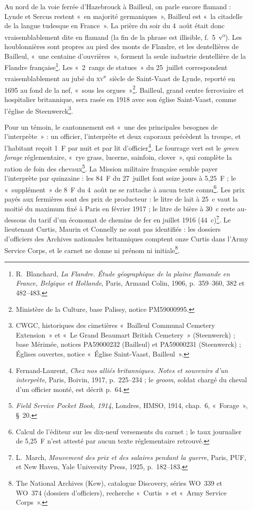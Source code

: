 Au nord de la voie ferrée d'Hazebrouck à Bailleul, on parle encore flamand : Lynde et Sercus restent «~en majorité germaniques~», Bailleul est «~la citadelle de la langue tudesque en France~». La prière du soir du 4~août était donc vraisemblablement dite en flamand (la fin de la phrase est illisible, f.~5~v\textsuperscript{o}). Les houblonnières sont propres au pied des monts de Flandre, et les dentellières de Bailleul, «~une centaine d'ouvrières~», forment la seule industrie dentellière de la Flandre française\footnote{R.~Blanchard, \textit{La Flandre. Étude géographique de la plaine flamande en France, Belgique et Hollande}, Paris, Armand Colin, 1906, p.~359--360, 382 et 482--483.}. Les «~2~rangs de statues~» du 25~juillet correspondent vraisemblablement au jubé du \textsc{xv}\textsuperscript{e}~siècle de Saint-Vaast de Lynde, reporté en 1695 au fond de la nef, «~sous les orgues~»\footnote{Ministère de la Culture, base Palissy, notice PM59000995.}. Bailleul, grand centre ferroviaire et hospitalier britannique, sera rasée en 1918 avec son église Saint-Vaast, comme l'église de Steenwerck\footnote{CWGC, historiques des cimetières «~Bailleul Communal Cemetery Extension~» et «~Le Grand Beaumart British Cemetery~» (Steenwerck) ; base Mérimée, notices PA59000232 (Bailleul) et PA59000231 (Steenwerck) ; Églises ouvertes, notice «~Église Saint-Vaast, Bailleul~».}.

Pour un témoin, le cantonnement est «~une des principales besognes de l'interprète~» : un officier, l'interprète et deux caporaux précèdent la troupe, et l'habitant reçoit 1~F par nuit et par lit d'officier\footnote{Fernand-Laurent, \textit{Chez nos alliés britanniques. Notes et souvenirs d'un interprète}, Paris, Boivin, 1917, p.~225--234 ; le \textit{groom}, soldat chargé du cheval d'un officier monté, est décrit p.~64.}. Le fourrage vert est le \textit{green forage} réglementaire, «~rye grass, lucerne, sainfoin, clover~», qui complète la ration de foin des chevaux\footnote{\textit{Field Service Pocket Book, 1914}, Londres, HMSO, 1914, chap.~6, «~Forage~», §~20.}. La Mission militaire française semble payer l'interprète par quinzaine : les 84~F du 27~juillet font seize jours à 5,25~F ; le «~supplément~» de 8~F du 4~août ne se rattache à aucun texte connu\footnote{Calcul de l'éditeur sur les dix-neuf versements du carnet ; le taux journalier de 5,25~F n'est attesté par aucun texte réglementaire retrouvé.}. Les prix payés aux fermières sont des prix de producteur : le litre de lait à 25~c vaut la moitié du maximum fixé à Paris en février 1917 ; le litre de bière à 30~c reste au-dessous du tarif d'un économat de chemins de fer en juillet 1916 (44~c)\footnote{L.~March, \textit{Mouvement des prix et des salaires pendant la guerre}, Paris, PUF, et New Haven, Yale University Press, 1925, p.~182--183.}. Le lieutenant Curtis, Maurin et Connelly ne sont pas identifiés : les dossiers d'officiers des Archives nationales britanniques comptent onze Curtis dans l'Army Service Corps, et le carnet ne donne ni prénom ni initiale\footnote{The National Archives (Kew), catalogue Discovery, séries WO~339 et WO~374 (dossiers d'officiers), recherche «~Curtis~» et «~Army Service Corps~».}.

